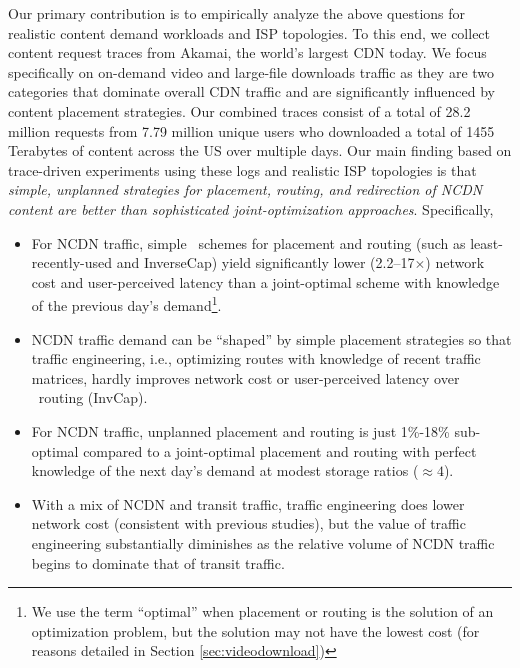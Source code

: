 Our primary contribution is to empirically analyze the above questions for realistic content demand workloads and ISP topologies. To this end, we collect content request traces from Akamai, the world's largest CDN today. We focus specifically on on-demand video and large-file downloads traffic as they are two categories that dominate overall CDN traffic and are significantly influenced by content placement strategies. Our combined traces consist of a total of 28.2  million requests from 7.79 million unique users who downloaded a total of 1455 Terabytes of content across the US over multiple days. Our main finding based on trace-driven experiments using these logs and realistic ISP topologies is that {\em simple, unplanned strategies for placement, routing, and redirection of NCDN content are better than sophisticated joint-optimization approaches}. Specifically,
\begin{itemize}
\item For NCDN traffic, simple \unplanned\ schemes for placement and routing (such as least-recently-used and InverseCap)  yield significantly lower (2.2--17$\times$) network cost and user-perceived latency than a joint-optimal scheme with knowledge of the previous day's demand\footnote{We use the term ``optimal'' when placement or routing is the solution of an optimization problem, but the solution may not have the lowest cost (for reasons detailed in Section \ref{sec:videodownload})}. 
\item NCDN traffic demand can be ``shaped'' by simple placement strategies so that  traffic engineering, i.e., optimizing routes with knowledge of recent traffic matrices, hardly improves network cost or user-perceived latency over \unplanned\ routing (InvCap).
\item For NCDN traffic, unplanned placement and routing is just 1\%-18\% sub-optimal compared to a joint-optimal placement and routing with perfect knowledge of the next day's demand at modest storage ratios ($\approx4$). %
\item With a mix of NCDN and transit traffic, traffic engineering does lower network cost (consistent with previous studies), but the value of traffic engineering substantially diminishes as the relative volume of NCDN traffic begins to dominate that of transit traffic.
\end{itemize}
\vspace{-0.08in}


